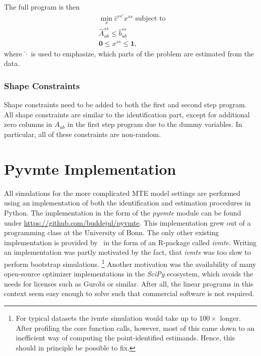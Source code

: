 \documentclass[12pt,a4paper,english]{article} %
\numberwithin{equation}{section}
\theoremstyle{definition}
\theoremstyle{remark}
\theoremstyle{plain}
\begin{document}
The full program is then
\begin{align}
  & \min_x \hat{c}^{ss'}x^{ss} \text{ subject to }\\
  & \hat{A}_{ub}^{ss} \leq \hat{b}_{ub}^{ss} \\
  & \mathbf{0} \leq x^{ss} \leq \mathbf{1},
\end{align}
where $\hat{\cdot}$ is used to emphasize, which parts of the problem are estimated from the data.

\subsubsection{Shape Constraints}
Shape constraints need to be added to both the first and second step program.
All shape constraints are similar to the identification part, except for additional zero columns in $A_{ub}$ in the first step program due to the dummy variables.
In particular, all of these constraints are non-random.

\clearpage
\newpage

\section{Pyvmte Implementation}\label{app_sec:pyvmte}
All simulations for the more complicated MTE model settings are performed using an implementation of both the identification and estimation procedures in Python.
The implementation in the form of the \textit{pyvmte} module can be found under \url{https://github.com/buddejul/pyvmte}.
This implementation grew out of a programming class at the University of Bonn.
The only other existing implementation is provided by~\cite{shea2023ivmte} in the form of an R-package called \textit{ivmte}.
Writing an implementation was partly motivated by the fact, that \textit{ivmte} was too slow to perform bootstrap simulations.
\footnote{For typical datasets the ivmte simulation would take up to $100\times$ longer.
After profiling the core function calls, however, most of this came down to an inefficient way of computing the point-identified estimands.
Hence, this should in principle be possible to fix.}
Another motivation was the availability of many open-source optimizer implementations in the \textit{SciPy} ecosystem, which avoids the needs for licenses such as Gurobi or similar.
After all, the linear programs in this context seem easy enough to solve such that commercial software is not required.
\end{document}
